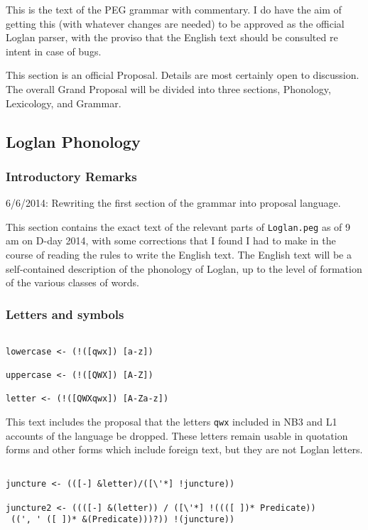 \documentclass[12pt]{article}
\begin{document}
This is the text of the PEG grammar with commentary.  I do have the aim of getting this (with whatever changes are needed) to be approved as the official Loglan parser, with the proviso that the English text should be consulted re intent in case of bugs.

This section is an official Proposal.  Details are most certainly open to discussion.  The overall Grand Proposal will be divided into three sections, Phonology, Lexicology, and Grammar.

\subsection{Loglan Phonology}

\subsubsection{Introductory Remarks}

6/6/2014:  Rewriting the first section of the grammar into proposal language.

This section contains the exact text of the relevant parts of {\tt Loglan.peg} as of 9 am on D-day 2014, with some corrections that I found I had to make in the course of reading the rules to write the English text.  The English text will be
a self-contained description of the phonology of Loglan, up to the level of formation of the various classes
of words.

\subsubsection{Letters and symbols}

\begin{verbatim}

lowercase <- (!([qwx]) [a-z])

uppercase <- (!([QWX]) [A-Z])

letter <- (!([QWXqwx]) [A-Za-z])

\end{verbatim}

This text includes the proposal that the letters {\tt qwx} included in NB3 and L1 accounts of the language
be dropped.  These letters remain usable in quotation forms and other forms which include foreign text,
but they are not Loglan letters.

\begin{verbatim}

juncture <- (([-] &letter)/([\'*] !juncture))

juncture2 <- ((([-] &(letter)) / ([\'*] !((([ ])* Predicate))
 ((', ' ([ ])* &(Predicate)))?)) !(juncture))

\end{verbatim}
\end{document}
